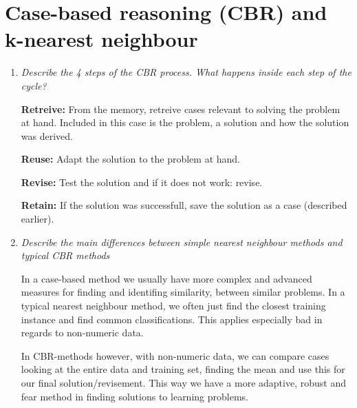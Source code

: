 \documentclass{article}
\begin{document}
\section*{Case-based reasoning (CBR) and k-nearest neighbour}

\begin{enumerate}[1.]

\item \textit{ Describe the 4 steps of the CBR process. What happens inside each
step of the cycle?}

{\bf Retreive:} From the memory, retreive cases relevant to solving the problem
at hand. Included in this case is the problem, a solution and how the solution
was derived.

{\bf Reuse:} Adapt the solution to the problem at hand.

{\bf Revise:} Test the solution and if it does not work: revise.

{\bf Retain:} If the solution was successfull, save the solution as a case
(described earlier). 

\item \textit{ Describe the main differences between simple nearest neighbour
methods and typical CBR methods}

In a case-based method we usually have more complex and advanced measures for
finding and identifing similarity, between similar problems. In a typical
nearest neighbour method, we often just find the closest training instance and
find common classifications. This applies especially bad in regards to
non-numeric data.

In CBR-methods however, with non-numeric data, we can compare cases looking at
the entire data and training set, finding the mean and use this for our final
solution/revisement. This way we have a more adaptive, robust and fear method
in finding solutions to learning problems.

\end{enumerate}
\end{document}
